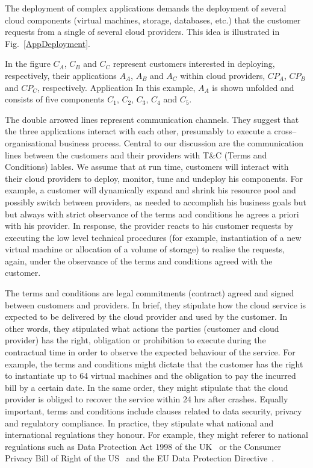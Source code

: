 \documentclass[runningheads,a4paper]{llncs}
\begin{document}
The deployment of complex applications demands the deployment of
several cloud components (virtual machines, storage, databases, etc.) that
the customer requests from a single of several cloud providers. This
idea is illustrated in Fig.~\ref{AppDeployment}.

In the figure $C_A$, $C_B$ and $C_C$ represent customers interested in
deploying, respectively, their applications $A_A$, $A_B$ and $A_C$ within
cloud providers, ${CP}_A$, ${CP}_B$ and ${CP}_C$, respectively. Application
In this example, $A_A$ is shown unfolded and consists of five components  
$C_1$, $C_2$, $C_3$, $C_4$ and $C_5$. 

The double arrowed lines represent communication channels. They 
suggest that the three applications interact with each other,
presumably to execute a cross--organisational business process.
Central to our discussion are the communication lines between
the customers and their providers with T\&C (Terms and Conditions)
lables. We assume that at run time, customers will interact with
their cloud providers to deploy, monitor, tune and undeploy
his components. For example, a customer will dynamically expand 
and shrink his resource pool and possibly switch between 
providers, as needed to accomplish his business goals but 
but always with strict observance of the terms and conditions he 
agrees a priori with his provider. In response, the provider
reacts to his customer requests by executing the low level
technical procedures (for example, instantiation of a new
virtual machine or allocation of a volume of storage) to realise the 
requests, again, under the observance of the terms and conditions 
agreed with the customer.

The terms and conditions are legal commitments (contract) agreed
and signed between customers and providers. In brief, they
stipulate how the cloud service is expected to be delivered
by the cloud provider and used by the customer. In other words,
they stipulated what actions the parties (customer and cloud provider)
has the right, obligation or prohibition to execute during the
contractual time in order to observe the expected behaviour
of the service. For example, the terms and conditions might
dictate that the customer has the right to instantiate up
to 64 virtual machines and the obligation to pay the incurred
bill by a certain date. In the same order, they might stipulate
that the cloud provider is obliged to recover the service within
24 hrs after crashes. Equally important, terms and conditions
include clauses related to data security, privacy and 
regulatory compliance. In practice, they stipulate what national
and international regulations they honour.  For example,
they might referer to national regulations such as
Data Protection Act 1998 of the UK~\cite{DPAGuide2014} or the 
Consumer Privacy Bill of Right of the US~\cite{CDP2012} and 
the EU Data Protection Directive~\cite{DPDoct1995}.
  
\end{document}
